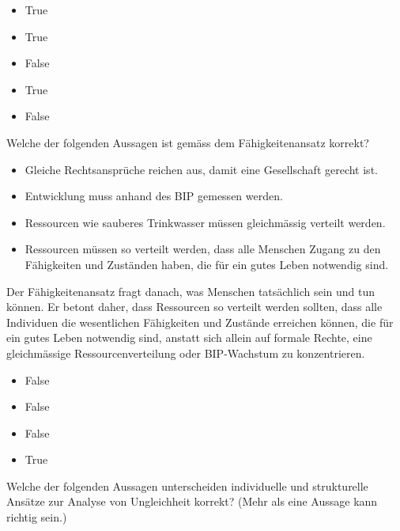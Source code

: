 \documentclass[
  nswissgerman,
  a4paper,
  openany]{book}
\providecommand{\tightlist}{%
  \setlength{\itemsep}{0pt}\setlength{\parskip}{0pt}}
\begin{document}
\begin{itemize}
\tightlist
\item
  True
\item
  True
\item
  False
\item
  True
\item
  False
\end{itemize}

Welche der folgenden Aussagen ist gemäss dem Fähigkeitenansatz korrekt?

\begin{itemize}
\tightlist
\item[$\square$]
  Gleiche Rechtsansprüche reichen aus, damit eine Gesellschaft gerecht
  ist.
\item[$\square$]
  Entwicklung muss anhand des BIP gemessen werden.
\item[$\square$]
  Ressourcen wie sauberes Trinkwasser müssen gleichmässig verteilt
  werden.
\item[$\square$]
  Ressourcen müssen so verteilt werden, dass alle Menschen Zugang zu den
  Fähigkeiten und Zuständen haben, die für ein gutes Leben notwendig
  sind.
\end{itemize}

Der Fähigkeitenansatz fragt danach, was Menschen tatsächlich sein und
tun können. Er betont daher, dass Ressourcen so verteilt werden sollten,
dass alle Individuen die wesentlichen Fähigkeiten und Zustände erreichen
können, die für ein gutes Leben notwendig sind, anstatt sich allein auf
formale Rechte, eine gleichmässige Ressourcenverteilung oder
BIP-Wachstum zu konzentrieren.

\begin{itemize}
\tightlist
\item
  False
\item
  False
\item
  False
\item
  True
\end{itemize}

Welche der folgenden Aussagen unterscheiden individuelle und
strukturelle Ansätze zur Analyse von Ungleichheit korrekt? (Mehr als
eine Aussage kann richtig sein.)
\end{document}
